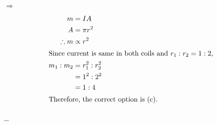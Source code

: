\documentclass[preview, border={10mm, 5mm, 10mm, 10mm}]{standalone}
\title{\textsc{}}
\newenvironment{solution}{\par\noindent\color{red!80!black}$\Rightarrow$\enspace\ignorespaces}{\par}
\begin{document}
\begin{solution}
    \begin{align*}
    m &= I A\\
    A &= \pi r^2\\
    \therefore m &\propto r^2\\
    \intertext{Since current is same in both coils and $r_1 : r_2 = 1 : 2$,}
    m_1 : m_2 &= r_1^2 : r_2^2\\
    &= 1^2 : 2^2\\
    &= 1 : 4\\
    \intertext{Therefore, the correct option is (c).}
    \end{align*}
\end{solution}
\hfill $\_\_$
\end{document}
